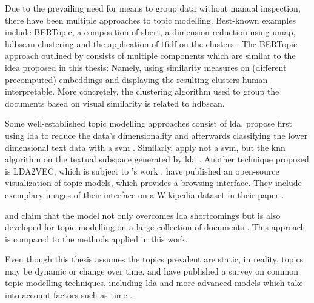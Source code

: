 Due to the prevailing need for means to group data without manual inspection, there have been multiple approaches to topic modelling.
Best-known examples include BERTopic, a composition of \ac{sbert}, a dimension reduction using \ac{umap}, \ac{hdbscan} clustering and the application of \ac{tfidf} on the clusters \cite{bertopic2022}.
The BERTopic approach outlined by \citeauthor{bertopic2022} consists of multiple components which are similar to the idea proposed in this thesis:
Namely, using similarity measures on (different precomputed) embeddings and displaying the resulting clusters human interpretable.
More concretely, the clustering algorithm used to group the documents based on visual similarity is related to \ac{hdbscan}.

Some well-established topic modelling approaches consist of \ac{lda}.
\citeauthor{lda2008} propose first using \ac{lda} to reduce the data's dimensionality and afterwards classifying the lower dimensional text data with a \ac{svm} \cite{lda2008}.
Similarly, \citeauthor{LDA2016} apply not a \ac{svm}, but the \ac{knn} algorithm on the textual subspace generated by \ac{lda} \cite{LDA2016}.
Another technique proposed is LDA2VEC, which is subject to \citeauthor{evolution_of_topic_modeling2022}'s work \cite{evolution_of_topic_modeling2022}.
\citeauthor{topic_modeling2021} have published an open-source visualization of topic models, which provides a browsing interface.
They include exemplary images of their interface on a Wikipedia dataset in their paper \cite{topic_modeling2021}.

\citeauthor{Top2Vec2020} and \citeauthor{Topic2Vec2015} claim that the \topTwovec{} model not only overcomes \ac{lda} shortcomings \cite{Top2Vec2020, Topic2Vec2015}
but is also developed for topic modelling on a large collection of documents \cite{Top2Vec2020}.
This approach is compared to the methods applied in this work.

Even though this thesis assumes the topics prevalent are static, in reality, topics may be dynamic or change over time.
\citeauthor{topic_modeling2015} and \citeauthor{topic_modeling2020} have published a survey on common topic modelling techniques, 
including \ac{lda} and more advanced models which take into account factors such as time \cite{topic_modeling2015, topic_modeling2020}.